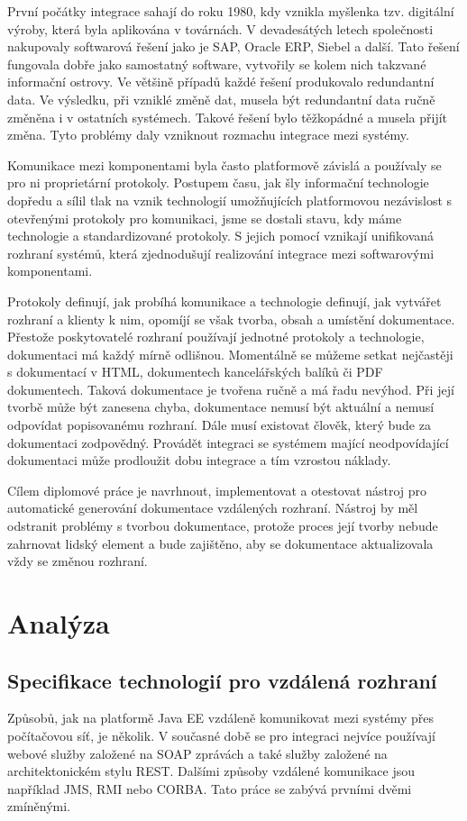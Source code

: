 \documentclass[11pt,twoside,a4paper]{book}
\begin{document}
První počátky integrace sahají do roku 1980, kdy vznikla myšlenka tzv. digitální výroby, která
byla aplikována v továrnách. V devadesátých letech společnosti nakupovaly softwarová řešení
jako je SAP, Oracle ERP, Siebel a další. Tato řešení fungovala dobře jako samostatný
software, vytvořily se kolem nich takzvané informační ostrovy. Ve většině případů každé
řešení produkovalo redundantní data. Ve výsledku, při vzniklé změně dat, musela
být redundantní data ručně změněna i v ostatních systémech. Takové řešení bylo
těžkopádné a musela přijít změna. Tyto problémy daly vzniknout rozmachu integrace mezi systémy.

Komunikace mezi komponentami byla často platformově závislá a používaly se pro ni
proprietární protokoly. Postupem času, jak šly informační technologie dopředu a sílil tlak na
vznik technologií umožňujících platformovou nezávislost s otevřenými protokoly pro
komunikaci, jsme se dostali stavu, kdy máme technologie a standardizované
protokoly.
S jejich pomocí vznikají unifikovaná rozhraní systémů, která zjednodušují realizování integrace mezi
softwarovými komponentami.

Protokoly definují, jak probíhá komunikace a technologie definují, jak vytvářet
rozhraní a klienty k nim, opomíjí se však tvorba, obsah a umístění dokumentace. Přestože poskytovatelé
rozhraní používají jednotné protokoly a technologie, dokumentaci má každý mírně
odlišnou.
Momentálně se můžeme setkat nejčastěji s dokumentací v HTML, dokumentech
kancelářských balíků či PDF dokumentech. Taková dokumentace je tvořena ručně a má řadu
nevýhod. Při její tvorbě může být zanesena chyba, dokumentace nemusí být aktuální a nemusí
odpovídat popisovanému rozhraní. Dále musí existovat člověk, který bude za
dokumentaci zodpovědný. Provádět integraci se systémem mající neodpovídající dokumentaci může
prodloužit dobu integrace a tím vzrostou náklady.

Cílem diplomové práce je navrhnout, implementovat a otestovat nástroj pro automatické
generování dokumentace vzdálených rozhraní. Nástroj by měl odstranit problémy s tvorbou
dokumentace, protože proces její tvorby nebude zahrnovat lidský element a bude zajištěno,
aby se dokumentace aktualizovala vždy se změnou rozhraní.

\chapter{Analýza}
\section{Specifikace technologií pro vzdálená rozhraní}
Způsobů, jak na platformě Java EE vzdáleně komunikovat mezi systémy přes
počítačovou síť, je několik. V současné době se pro integraci nejvíce používají
webové služby založené na SOAP zprávách a také služby založené na architektonickém stylu
REST. Dalšími způsoby vzdálené komunikace jsou například JMS, RMI nebo CORBA.
Tato práce se zabývá prvními dvěmi zmíněnými.
\end{document}
